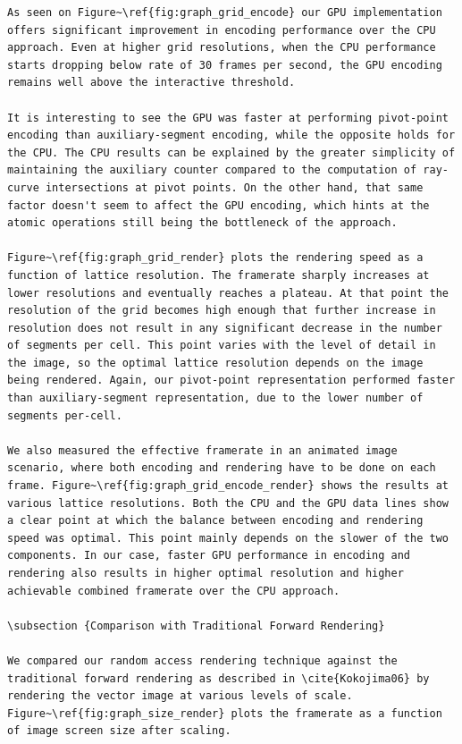 \documentclass[11pt,a4paper,twoside]{article}
\begin{document}
\begin {verbatim}
As seen on Figure~\ref{fig:graph_grid_encode} our GPU implementation offers significant improvement in encoding performance over the CPU approach. Even at higher grid resolutions, when the CPU performance starts dropping below rate of 30 frames per second, the GPU encoding remains well above the interactive threshold.

It is interesting to see the GPU was faster at performing pivot-point encoding than auxiliary-segment encoding, while the opposite holds for the CPU. The CPU results can be explained by the greater simplicity of maintaining the auxiliary counter compared to the computation of ray-curve intersections at pivot points. On the other hand, that same factor doesn't seem to affect the GPU encoding, which hints at the atomic operations still being the bottleneck of the approach.

Figure~\ref{fig:graph_grid_render} plots the rendering speed as a function of lattice resolution. The framerate sharply increases at lower resolutions and eventually reaches a plateau. At that point the resolution of the grid becomes high enough that further increase in resolution does not result in any significant decrease in the number of segments per cell. This point varies with the level of detail in the image, so the optimal lattice resolution depends on the image being rendered. Again, our pivot-point representation performed faster than auxiliary-segment representation, due to the lower number of segments per-cell.

We also measured the effective framerate in an animated image scenario, where both encoding and rendering have to be done on each frame. Figure~\ref{fig:graph_grid_encode_render} shows the results at various lattice resolutions. Both the CPU and the GPU data lines show a clear point at which the balance between encoding and rendering speed was optimal. This point mainly depends on the slower of the two components. In our case, faster GPU performance in encoding and rendering also results in higher optimal resolution and higher achievable combined framerate over the CPU approach.

\subsection {Comparison with Traditional Forward Rendering}

We compared our random access rendering technique against the traditional forward rendering as described in \cite{Kokojima06} by rendering the vector image at various levels of scale. Figure~\ref{fig:graph_size_render} plots the framerate as a function of image screen size after scaling.


\end{verbatim}
\end{document}
